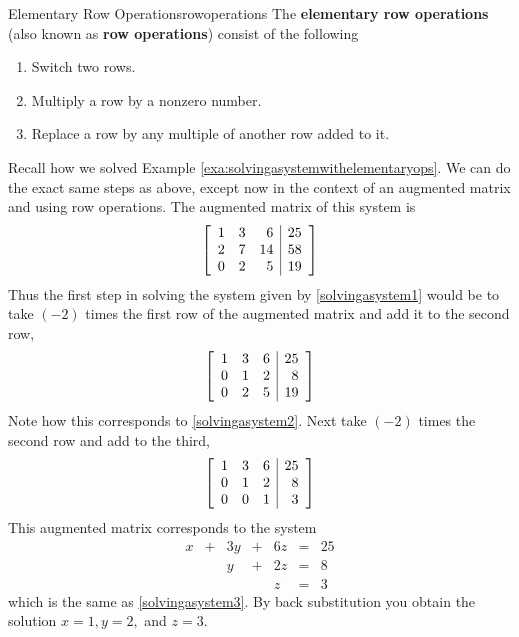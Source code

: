 \begin{definition}{Elementary Row Operations}{rowoperations}
The \textbf{elementary row operations} (also known as \textbf{row operations}) consist of the following  

\begin{enumerate}
\item Switch two rows.

\item Multiply a row by a nonzero number.


\item Replace a row by any multiple of another row added to it.
\end{enumerate}
\end{definition}

Recall how we solved Example \ref{exa:solvingasystemwithelementaryops}. 
We can do the exact same steps as above, except now in the context of an augmented matrix and using row operations. 
The augmented matrix of this system is 
\begin{equation*}
\left[ 
\begin{array}{rrr|r}
1 & 3 & 6 &  25 \\
2 & 7 & 14 &  58 \\
0 & 2 & 5 &  19
\end{array}
\right] 
\end{equation*}
Thus the first step in
solving the system given by \ref{solvingasystem1} would be to take $\left( -2\right) $ times the first row
of the augmented matrix and add it to the second row,
\begin{equation*}
\left[
\begin{array}{rrr|r}
1 & 3 & 6 & 25 \\
0 & 1 & 2 & 8 \\
0 & 2 & 5 & 19
\end{array}
\right] 
\end{equation*}
Note how this corresponds to \ref{solvingasystem2}. Next take $\left( -2\right) $
times the second row and add to the third,
\begin{equation*}
\left[ 
\begin{array}{rrr|r}
1 & 3 & 6 & 25 \\
0 & 1 & 2 & 8 \\
0 & 0 & 1 & 3
\end{array}
\right]
\end{equation*}
This augmented matrix corresponds to the system
\begin{equation*}
\begin{array}{ccccccc}
x&+&3y&+&6z&=&25 \\
&&y&+&2z&=&8 \\
&&&&z&=&3
\end{array}
\end{equation*}
which is the same as \ref{solvingasystem3}. By back substitution you obtain the solution
$x=1,y=2,$ and $z=3.$

